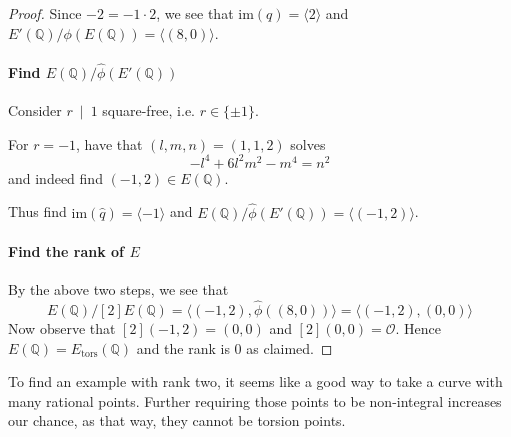\documentclass{scrartcl}
\newcommand{\Q}{\mathbb{Q}}
\newcommand{\im}{\mathrm{im}}
\renewcommand{\O}{\mathcal{O}}
\newcommand{\divides}{\ \mid \ }
\theoremstyle{definition}
\begin{document}
\begin{proof}
    Since $-2 = -1 \cdot 2$, we see that $\im(q) = \langle 2 \rangle$ and $E'(\Q)/\phi(E(\Q)) = \langle (8, 0) \rangle$.

    \paragraph{Find $E(\Q)/\hat{\phi}(E'(\Q))$} Consider $r \divides 1$ square-free, i.e. $r \in \{ \pm 1 \}$.

    For $r = -1$, have that $(l, m, n) = (1, 1, 2)$ solves
    \begin{equation*}
        -l^4 + 6l^2m^2 - m^4 = n^2
    \end{equation*}
    and indeed find $(-1, 2) \in E(\Q)$.

    Thus find $\im(\hat{q}) = \langle -1 \rangle$ and $E(\Q)/\hat{\phi}(E'(\Q)) = \langle (-1, 2) \rangle$.

    \paragraph{Find the rank of $E$} By the above two steps, we see that
    \begin{equation*}
        E(\Q)/[2]E(\Q) = \langle (-1, 2), \hat{\phi}((8, 0)) \rangle = \langle (-1, 2), (0, 0) \rangle
    \end{equation*}
    Now observe that $[2](-1, 2) = (0, 0)$ and $[2](0, 0) = \O$.
    Hence $E(\Q) = E_{\mathrm{tors}}(\Q)$ and the rank is 0 as claimed.
\end{proof}
To find an example with rank two, it seems like a good way to take a curve with many rational points.
Further requiring those points to be non-integral increases our chance, as that way, they cannot be torsion points.
\end{document}
